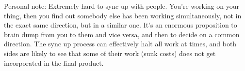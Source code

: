 \documentclass{tufte-handout}
\begin{document}
Personal note: Extremely hard to sync up with people. You're working
on your thing, then you find out somebody else has been working
simultaneously, not in the exact same direction, but in a similar one.
It's an enormous proposition to brain dump from you to them and vice
versa, and then to decide on a common direction. The sync up process
can effectively halt all work at times, and both sides are likely to
see that some of their work (sunk costs) does not get incorporated in
the final product.
\end{document}
